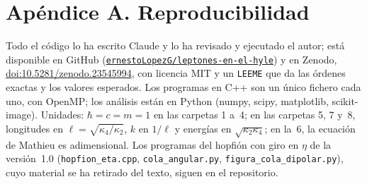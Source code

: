 \documentclass[11pt,a4paper]{article}
\newcommand{\prog}[1]{\texttt{#1}}
\begin{document}
\appendix
\renewcommand{\thesection}{\Alph{section}}
\section*{Apéndice A. Reproducibilidad}

Todo el código lo ha escrito Claude y lo ha revisado y ejecutado el autor; está disponible en GitHub (\href{https://github.com/ernestoLopezG/leptones-en-el-hyle}{\texttt{ernestoLopezG/leptones-en-el-hyle}}) y en Zenodo, \href{https://doi.org/10.5281/zenodo.23545994}{doi:10.5281/zenodo.23545994}, con licencia MIT y un \texttt{LEEME} que da las órdenes exactas y los valores esperados. Los programas en C++ son un único fichero cada uno, con OpenMP; los análisis están en Python (numpy, scipy, matplotlib, scikit-image). Unidades: $\hbar=c=m=1$ en las carpetas 1 a~4; en las carpetas 5, 7 y~8, longitudes en $\ell=\sqrt{\kappa_4/\kappa_2}$, $k$ en $1/\ell$ y energías en $\sqrt{\kappa_2\kappa_4}$; en la~6, la ecuación de Mathieu es adimensional. Los programas del hopfión con giro en $\eta$ de la versión~1.0 (\prog{hopfion\_eta.cpp}, \prog{cola\_angular.py}, \prog{figura\_cola\_dipolar.py}), cuyo material se ha retirado del texto, siguen en el repositorio.
\end{document}

